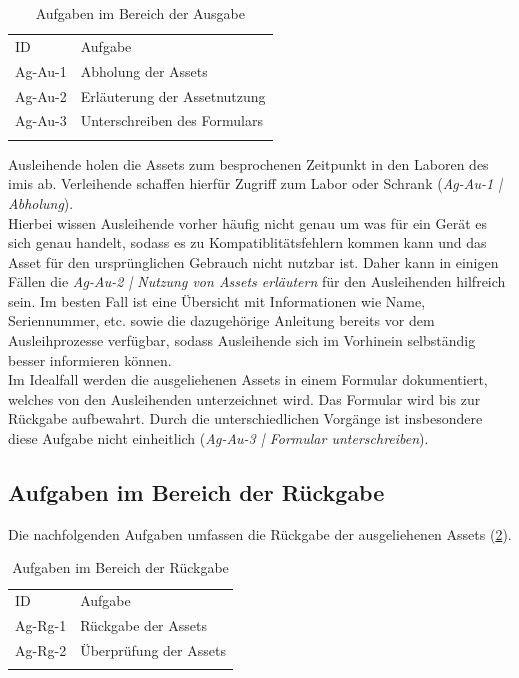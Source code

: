 \begin{table}[h]
        \centering
        \caption{Aufgaben im Bereich der Ausgabe}
        \begin{tabular}{ll}
                \arrayrulecolor{maincolor}\hline
                \sffamily\color{maincolor}ID & \sffamily\color{maincolor}Aufgabe \\
                \arrayrulecolor{maincolor}\hline
                Ag-Au-1                      & Abholung der Assets \\
                Ag-Au-2                      & Erläuterung der Assetnutzung \\
                Ag-Au-3                      & Unterschreiben des Formulars \\
                \arrayrulecolor{maincolor}\hline
        \end{tabular}
        \label{table:Ag-Au}
\end{table}

Ausleihende holen die Assets zum besprochenen Zeitpunkt in den Laboren des \ac{imis} ab. Verleihende
schaffen hierfür Zugriff zum Labor oder Schrank (\textit{Ag-Au-1 | Abholung}). \\
Hierbei wissen Ausleihende vorher häufig nicht genau um was für ein Gerät es sich genau handelt,
sodass es zu Kompatiblitätsfehlern kommen kann und das Asset für den ursprünglichen Gebrauch nicht
nutzbar ist. Daher kann in einigen Fällen die \textit{Ag-Au-2 | Nutzung von Assets erläutern} für
den Ausleihenden hilfreich sein. Im besten Fall ist eine Übersicht mit Informationen wie Name,
Seriennummer, etc. sowie die dazugehörige Anleitung bereits vor dem Ausleihprozesse verfügbar,
sodass Ausleihende sich im Vorhinein selbständig besser informieren können.\\
Im Idealfall werden die ausgeliehenen Assets in einem Formular dokumentiert, welches von den
Ausleihenden unterzeichnet wird. Das Formular wird bis zur Rückgabe aufbewahrt. Durch die
unterschiedlichen Vorgänge ist insbesondere diese Aufgabe nicht einheitlich (\textit{Ag-Au-3 |
Formular unterschreiben}).

\subsection{Aufgaben im Bereich der Rückgabe}
Die nachfolgenden Aufgaben umfassen die Rückgabe der ausgeliehenen Assets (\ref{table:Ag-Rg}).
\begin{table}[h]
        \centering
        \caption{Aufgaben im Bereich der Rückgabe}
        \begin{tabular}{ll}
                \arrayrulecolor{maincolor}\hline
                \sffamily\color{maincolor}ID & \sffamily\color{maincolor}Aufgabe \\
                \arrayrulecolor{maincolor}\hline
                Ag-Rg-1                      & Rückgabe der Assets \\
                Ag-Rg-2                      & Überprüfung der Assets \\
                \arrayrulecolor{maincolor}\hline
        \end{tabular}
        \label{table:Ag-Rg}
\end{table}

